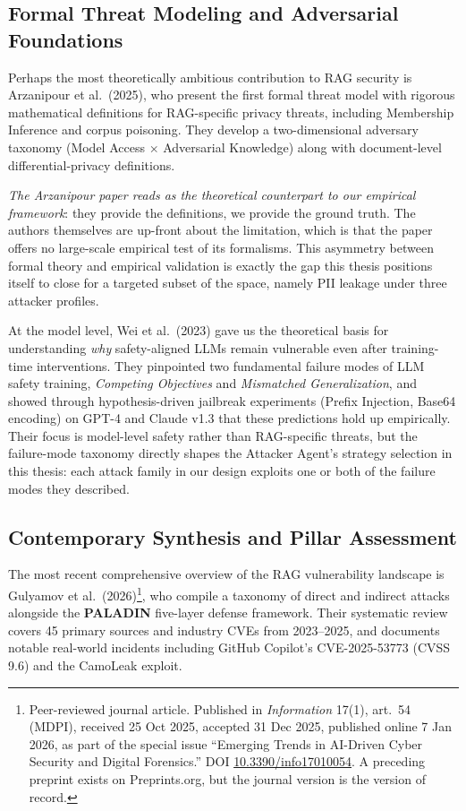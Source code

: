 \documentclass[12pt, a4paper]{article}
\begin{document}
\subsection{Formal Threat Modeling and Adversarial Foundations}

Perhaps the most theoretically ambitious contribution to RAG security is Arzanipour et al.\ (2025), who present the first formal threat model with rigorous mathematical definitions for RAG-specific privacy threats, including Membership Inference and corpus poisoning. They develop a two-dimensional adversary taxonomy (Model Access $\times$ Adversarial Knowledge) along with document-level differential-privacy definitions.

\begin{critbox}
\textit{The Arzanipour paper reads as the theoretical counterpart to our empirical framework}: they provide the definitions, we provide the ground truth. The authors themselves are up-front about the limitation, which is that the paper offers no large-scale empirical test of its formalisms. This asymmetry between formal theory and empirical validation is exactly the gap this thesis positions itself to close for a targeted subset of the space, namely PII leakage under three attacker profiles.
\end{critbox}

At the model level, Wei et al.\ (2023) gave us the theoretical basis for understanding \emph{why} safety-aligned LLMs remain vulnerable even after training-time interventions. They pinpointed two fundamental failure modes of LLM safety training, \emph{Competing Objectives} and \emph{Mismatched Generalization}, and showed through hypothesis-driven jailbreak experiments (Prefix Injection, Base64 encoding) on GPT-4 and Claude v1.3 that these predictions hold up empirically. Their focus is model-level safety rather than RAG-specific threats, but the failure-mode taxonomy directly shapes the Attacker Agent's strategy selection in this thesis: each attack family in our design exploits one or both of the failure modes they described.

\subsection{Contemporary Synthesis and Pillar Assessment}

The most recent comprehensive overview of the RAG vulnerability landscape is Gulyamov et al.\ (2026)\footnote{Peer-reviewed journal article. Published in \emph{Information} 17(1), art.~54 (MDPI), received 25 Oct 2025, accepted 31 Dec 2025, published online 7 Jan 2026, as part of the special issue ``Emerging Trends in AI-Driven Cyber Security and Digital Forensics.'' DOI \href{https://doi.org/10.3390/info17010054}{10.3390/info17010054}. A preceding preprint exists on Preprints.org, but the journal version is the version of record.}, who compile a taxonomy of direct and indirect attacks alongside the \textbf{PALADIN} five-layer defense framework. Their systematic review covers 45 primary sources and industry CVEs from 2023--2025, and documents notable real-world incidents including GitHub Copilot's CVE-2025-53773 (CVSS 9.6) and the CamoLeak exploit.
\end{document}
